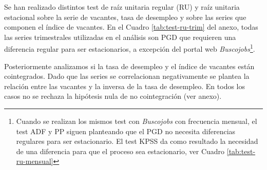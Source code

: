 \documentclass[12pt,oneside]{reedthesis}
\begin{document}
Se han realizado distintos test de raíz unitaria regular (RU) y raíz unitaria estacional sobre la serie de vacantes, tasa de desempleo y sobre las series que componen el índice de vacantes. En el Cuadro \ref{tab:test-ru-trim} del anexo, todas las series trimestrales utilizadas en el análisis son PGD que requieren una diferencia regular para ser estacionarios, a excepción del portal web \emph{Buscojobs}\footnote{Cuando se realizan los mismos test con \emph{Buscojobs} con frecuencia mensual, el test ADF y PP siguen planteando que el PGD no necesita diferencias regulares para ser estacionario. El test KPSS da como resultado la necesidad de una diferencia para que el proceso sea estacionario, ver Cuadro \ref{tab:test-ru-mensual}}.

Posteriormente analizamos si la tasa de desempleo y el índice de vacantes están cointegrados. Dado que las series se correlacionan negativamente se plantea la relación entre las vacantes y la inversa de la tasa de desempleo. En todos los casos no se rechaza la hipótesis nula de no cointegración (ver anexo).
\end{document}
